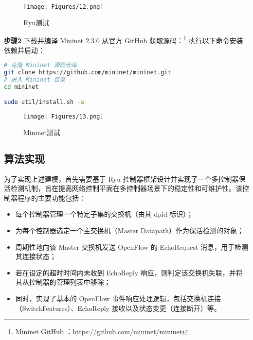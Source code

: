\documentclass{article}
\begin{document}
\begin{figure}[h]
    \centering
    \texttt{[image: Figures/12.png]}
    \caption{Ryu测试}
\end{figure}


\noindent \textbf{步骤2} 下载并编译 Mininet 2.3.0
从官方 GitHub 获取源码：\footnote{Mininet GitHub ：https://github.com/mininet/mininet}
执行以下命令安装依赖并启动：
\begin{lstlisting}[language=bash, caption={Mininet 安装与测试}]
# 克隆 Mininet 源码仓库
git clone https://github.com/mininet/mininet.git
# 进入 Mininet 目录
cd mininet

sudo util/install.sh -a
\end{lstlisting}


\begin{figure}[h]
    \centering
    \texttt{[image: Figures/13.png]}
    \caption{Mininet测试}
\end{figure}



\subsection{\textbf{算法实现}}

\quad\quad 为了实现上述建模，首先需要基于 Ryu 控制器框架设计并实现了一个多控制器保活检测机制，旨在提高网络控制平面在多控制器场景下的稳定性和可维护性。该控制器程序的主要功能包括：

\begin{itemize}
\item 每个控制器管理一个特定子集的交换机（由其 dpid 标识）；
\item 为每个控制器选定一个主交换机（Master Datapath）作为保活检测的对象；
\item 周期性地向该 Master 交换机发送 OpenFlow 的 EchoRequest 消息，用于检测其连接状态；
\item 若在设定的超时时间内未收到 EchoReply 响应，则判定该交换机失联，并将其从控制器的管理列表中移除；
\item 同时，实现了基本的 OpenFlow 事件响应处理逻辑，包括交换机连接（SwitchFeatures）、EchoReply 接收以及状态变更（连接断开）等。
\end{itemize}
\end{document}
